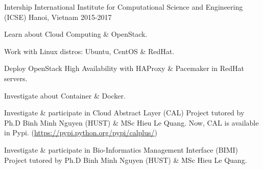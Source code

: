\begin{cventries}
  \cventry
    {Intership} %
    {International Institute for Computational Science and Engineering (ICSE)} %
    {Hanoi, Vietnam} %
    {2015-2017} %
    {
      \begin{cvitems} %
        \item {Learn about Cloud Computing \& OpenStack.}
        \item {Work with Linux distros: Ubuntu, CentOS \& RedHat.}
        \item {Deploy OpenStack High Availability with HAProxy \& Pacemaker in RedHat servers.}
        \item {Investigate about Container \& Docker.}
        \item {Investigate \& participate in Cloud Abstract Layer (CAL) Project tutored by Ph.D Binh Minh Nguyen (HUST) \& MSc Hieu Le Quang. Now, CAL is available in Pypi. (\url{https://pypi.python.org/pypi/calplus/})}
        \item {Investigate \& participate in Bio-Informatics Management Interface (BIMI) Project tutored by Ph.D Binh Minh Nguyen (HUST) \& MSc Hieu Le Quang.}
      \end{cvitems}
    }

\end{cventries}
